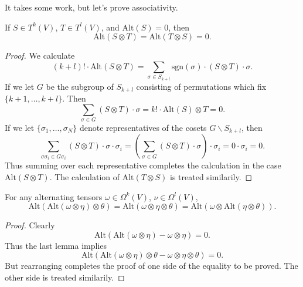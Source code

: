 It takes some work, but let's prove associativity.

\begin{lemma}
    If $S \in T^k(V)$, $T \in T^l(V)$, and $\text{Alt}(S) = 0$, then
    \[ \text{Alt}(S \otimes T) = \text{Alt}(T \otimes S) = 0. \]
\end{lemma}
\begin{proof}
    We calculate
    \[ (k+l)! \cdot \text{Alt}(S \otimes T) = \sum_{\sigma \in S_{k+l}} \text{sgn}(\sigma) \cdot (S \otimes T) \cdot \sigma. \]
    If we let $G$ be the subgroup of $S_{k+l}$ consisting of permutations which fix $\{ k+1, \dots, k+l \}$. Then
    \[ \sum_{\sigma \in G} (S \otimes T) \cdot \sigma = k! \cdot \text{Alt}(S) \otimes T = 0. \]
    If we let $\{ \sigma_1, \dots, \sigma_N \}$ denote representatives of the cosets $G \backslash S_{k+l}$, then
    \[ \sum_{\sigma \sigma_i \in G \sigma_i} (S \otimes T) \cdot \sigma \cdot \sigma_i = \left( \sum_{\sigma \in G} (S \otimes T) \cdot \sigma \right) \cdot \sigma_i = 0 \cdot \sigma_i = 0. \]
    Thus summing over each representative completes the calculation in the case $\text{Alt}(S \otimes T)$. The calculation of $\text{Alt}(T \otimes S)$ is treated similarily.
\end{proof}

\begin{lemma}
    For any alternating tensors $\omega \in \Omega^k(V)$, $\nu \in \Omega^l(V)$,
    \[ \text{Alt}(\text{Alt}(\omega \otimes \eta) \otimes \theta) = \text{Alt}(\omega \otimes \eta \otimes \theta) = \text{Alt}(\omega \otimes \text{Alt}(\eta \otimes \theta)). \]
\end{lemma}
\begin{proof}
    Clearly
    \[ \text{Alt}(\text{Alt}(\omega \otimes \eta) - \omega \otimes \eta) = 0. \]
    Thus the last lemma implies
    \[ \text{Alt}(\text{Alt}(\omega \otimes \eta) \otimes \theta - \omega \otimes \eta \otimes \theta) = 0. \]
    But rearranging completes the proof of one side of the equality to be proved. The other side is treated similarily.
\end{proof}

